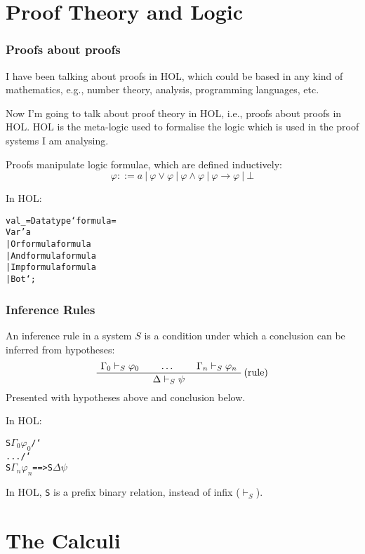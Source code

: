 \documentclass[english,svgnames,hide notes,12pt]{beamer}
\theoremstyle{definition}
\theoremstyle{remark}
\begin{document}
\section{Proof Theory and Logic}

\begin{frame}
    \frametitle{Proofs about proofs}
    I have been talking about proofs in HOL, which could be based in any kind of mathematics, e.g., number theory, analysis, programming languages, etc.

    \bigskip
    Now I'm going to talk about proof theory in HOL, i.e., proofs about proofs in HOL. HOL is the meta-logic used to formalise the logic which is used in the proof systems I am analysing.
\end{frame}

\begin{frame}[fragile]
    Proofs manipulate logic formulae, which are defined inductively:
    \[ \varphi ::= a~|~\varphi \lor \varphi~|~\varphi \land \varphi~|~\varphi \to \varphi~|~\bot \]

    \bigskip
    In HOL:
    \small
\begin{alltt}
val _ = Datatype `formula =
    Var 'a
    | Or formula formula
    | And formula formula
    | Imp formula formula
    | Bot`;
\end{alltt}
\end{frame}

\newcommand{\bs}{\char`\\}
\begin{frame}[fragile]
    \frametitle{Inference Rules}
    An inference rule in a system $S$ is a condition under which a conclusion can be inferred from hypotheses:
    \[
        \AxiomC{$\Gamma_0 \vdash_S \varphi_0$}
        \AxiomC{$\dots$}
        \AxiomC{$\Gamma_n \vdash_S \varphi_n$}
        \RightLabel{(rule)}
        \TrinaryInfC{$\Delta \vdash_S \psi$}
        \DisplayProof
    \]
    Presented with hypotheses above and conclusion below.

    \bigskip
    In HOL:
    \begin{alltt}
        S \(\Gamma_0\) \(\varphi_0\) /\bs{} ... /\bs{} S \(\Gamma_n\) \(\varphi_n\) ==> S \(\Delta\) \(\psi\)
    \end{alltt}

    In HOL, \texttt{S} is a prefix binary relation, instead of infix ($\vdash_S$).
\end{frame}

\section{The Calculi}
\end{document}
